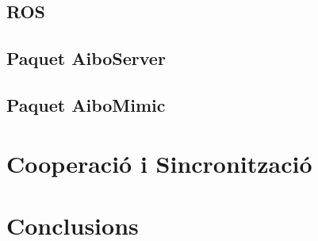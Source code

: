 \documentclass[12pt,a4paper,final,twoside]{article}
\begin{document}
\subsection{ROS}
\label{ros}
\subsection{Paquet AiboServer }
\subsection{Paquet AiboMimic}
\section{Cooperació i Sincronització}
\section*{Conclusions}
\end{document}
